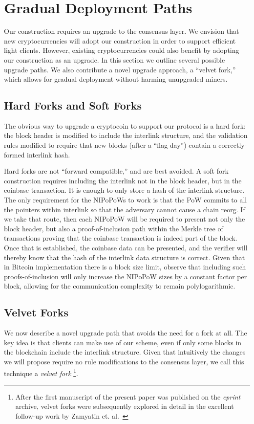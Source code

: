 \section{Gradual Deployment Paths}

\label{sec.forks}
Our construction requires an upgrade to the consensus layer. We envision that
new cryptocurrencies will adopt our construction in order to support efficient
light clients. However, existing cryptocurrencies could also benefit by adopting
our construction as an upgrade. In this section we outline several possible
upgrade paths. We also contribute a novel upgrade approach, a ``velvet fork,''
which allows for gradual deployment without harming unupgraded miners.

\subsection{Hard Forks and Soft Forks}
The obvious way to upgrade a cryptocoin to support our protocol is a hard fork:
the block header is modified to include the interlink structure, and the
validation rules modified to require that new blocks (after a ``flag day'')
contain a correctly-formed interlink hash.

Hard forks are not ``forward compatible,'' and are best avoided. A soft fork
construction requires including the interlink not in the block
header, but in the coinbase transaction. It is enough to only store a hash of
the interlink structure. The only requirement for the NIPoPoWs to work is that the
PoW commits to all the pointers within interlink so that the adversary cannot
cause a chain reorg. If we take that route, then each NIPoPoW will be required to
present not only the block header, but also a proof-of-inclusion path within the
Merkle tree of transactions proving that the coinbase transaction is indeed part
of the block. Once that is established, the coinbase data can be presented, and
the verifier will thereby know that the hash of the interlink data structure is
correct. Given that in Bitcoin implementation there is a block size limit,
observe that including such proofs-of-inclusion will only increase the NIPoPoW
sizes by a constant factor per block, allowing for the communication complexity
to remain polylogarithmic.

\subsection{Velvet Forks}
We now describe a novel upgrade path that avoids the need for a fork at all. The
key idea is that clients can make use of our scheme, even if only some blocks in
the blockchain include the interlink structure. Given that intuitively the
changes we will propose require no rule modifications to the consensus layer, we call this
technique a \textit{velvet fork}
\footnote{After the first manuscript of the present paper was published on the
\textit{eprint} archive, velvet forks were subsequently explored in detail in
the excellent follow-up work by Zamyatin et. al.~\cite{velvet}}.


